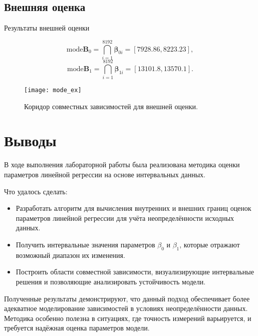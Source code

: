 \documentclass[a4paper,14pt]{article}
\begin{document}
  \subsection{Внешняя оценка}

  Результаты внешней оценки

  \[
    \text{mode} \mathbf{B}_0 = \bigcap_{i=1}^{8192} \mathbf{\beta}_{0i}
      = [7928.86, 8223.23],
  \]
  \[
    \text{mode} \mathbf{B}_1 = \bigcap_{i=1}^{8192} \mathbf{\beta}_{1i}
      = [13101.8, 13570.1].
  \]

    \begin{figure}[H]
        \begin{center}
            \texttt{[image: mode\_ex]}
            \caption{Коридор совместных зависимостей для внешней оценки.}
    \label{figure:ext_est}
        \end{center}
    \end{figure}

    \clearpage
    \section{Выводы}
    В ходе выполнения лабораторной работы была реализована методика оценки  
    параметров линейной регрессии на основе интервальных данных. 

    Что удалось сделать:
    
    \begin{itemize}  
      \item Разработать алгоритм для вычисления внутренних и внешних границ  
        оценок параметров линейной регрессии для учёта  
        неопределённости исходных данных.  
      \item Получить интервальные значения параметров \( \beta_0 \) и  
        \( \beta_1 \), которые отражают возможный диапазон их изменения.  
      \item Построить области совместной зависимости, визуализирующие  
        интервальные решения и позволяющие анализировать устойчивость модели.  
    \end{itemize}  
    
    Полученные результаты демонстрируют, что данный подход обеспечивает более  
    адекватное моделирование зависимостей в условиях неопределённости данных.  
    Методика особенно полезна в ситуациях, где точность измерений  
    варьируется, и требуется надёжная оценка параметров модели.  
  
\end{document}
